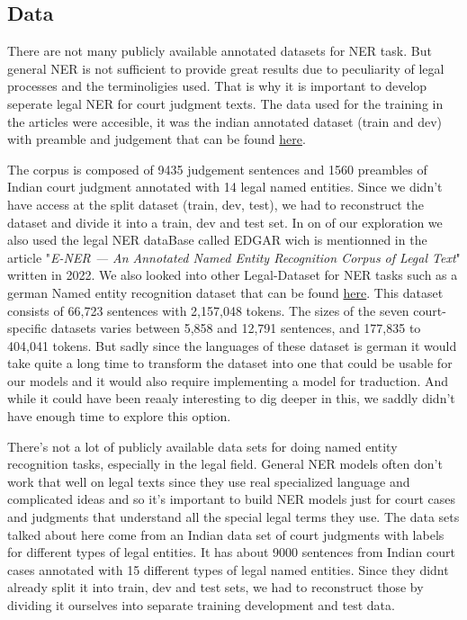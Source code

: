 \documentclass{article}
\begin{document}
\subsection{Data}

\color{orange}
There are not many publicly available annotated datasets for NER task. But general NER is not sufficient to provide great results due to peculiarity of legal processes and the terminoligies used. That is why it is important to develop seperate legal NER for court judgment texts. The data used for the training in the articles were accesible, it was the indian annotated dataset (train and dev) with preamble and judgement that can be found \href{https://github.com/Legal-NLP-EkStep/legal_NER}{here}. 


The corpus is composed of 9435 judgement sentences and 1560 preambles of Indian court judgment annotated with 14 legal named entities. Since we didn't have access at the split dataset (train, dev, test), we had to reconstruct the dataset and divide it into a train, dev and test set. In on of our exploration we also used the legal NER dataBase called EDGAR wich is mentionned in the article "\textit{E-NER — An Annotated Named Entity Recognition Corpus of Legal Text}" \cite{E-NER} written in 2022. We also looked into other Legal-Dataset for NER tasks such as a german Named entity recognition dataset that can be found \href{https://github.com/elenanereiss/Legal-Entity-Recognition}{here}. This dataset consists of 66,723 sentences with 2,157,048 tokens. The sizes of the seven court-specific datasets varies between 5,858 and 12,791 sentences, and 177,835 to 404,041 tokens. But sadly since the languages of these dataset is german it would take quite a long time to transform the dataset into one that could be usable for our models and it would also require implementing a model for traduction. And while it could have been reaaly interesting to dig deeper in this, we saddly didn't have enough time to explore this option.


There's not a lot of publicly available data sets for doing named entity recognition tasks, especially in the legal field.  General NER models often don't work that well on legal texts since they use real specialized language and complicated ideas and  so it's important to build NER models just for court cases and judgments that understand all the special legal terms they use.  The data sets talked about here come from an Indian data set of court judgments with labels for different types of legal entities.  It has about 9000 sentences from Indian court cases annotated with 15 different types of legal named entities.  Since they didnt already split it into train, dev and test sets, we had to reconstruct those by dividing it ourselves into separate training development and test data. 
\end{document}
